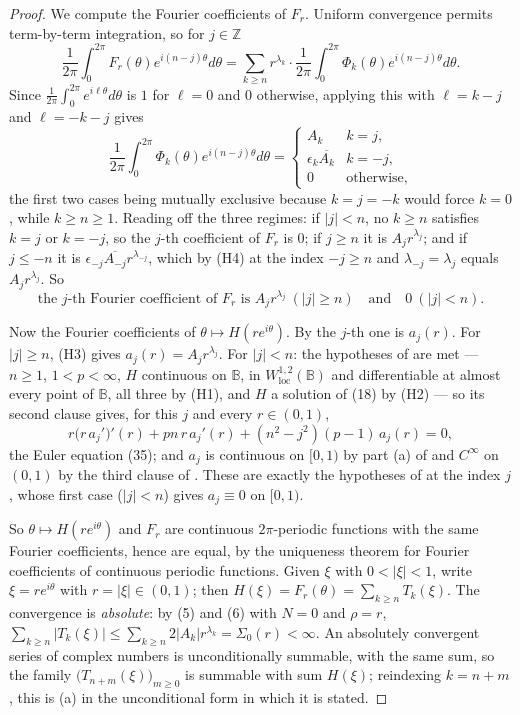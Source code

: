 \begin{proof}
We compute the Fourier coefficients of $F_r$.  Uniform convergence permits
term-by-term integration, so for $j\in\mathbb{Z}$
\[
  \frac1{2\pi}\int_0^{2\pi}F_r(\theta)e^{i(n-j)\theta}d\theta
  =\sum_{k\ge n}r^{\lambda_k}\cdot\frac1{2\pi}
    \int_0^{2\pi}\Phi_k(\theta)e^{i(n-j)\theta}d\theta .
\]
Since $\frac1{2\pi}\int_0^{2\pi}e^{i\ell\theta}d\theta$ is $1$ for $\ell=0$ and
$0$ otherwise, applying this with $\ell=k-j$ and $\ell=-k-j$ gives
\[
  \frac1{2\pi}\int_0^{2\pi}\Phi_k(\theta)e^{i(n-j)\theta}d\theta
  =\begin{cases}
     A_k&k=j,\\
     \epsilon_k\overline{A_k}&k=-j,\\
     0&\text{otherwise},
   \end{cases}
\]
the first two cases being mutually exclusive because $k=j=-k$ would force
$k=0$, while $k\ge n\ge1$.  Reading off the three regimes: if $|j|<n$, no
$k\ge n$ satisfies $k=j$ or $k=-j$, so the $j$-th coefficient of $F_r$ is $0$;
if $j\ge n$ it is $A_jr^{\lambda_j}$; and if $j\le-n$ it is
$\epsilon_{-j}\overline{A_{-j}}r^{\lambda_{-j}}$, which by (H4) at the index
$-j\ge n$ and $\lambda_{-j}=\lambda_j$ equals $A_jr^{\lambda_j}$.  So
\begin{equation}\tag{12}
  \text{the }j\text{-th Fourier coefficient of }F_r\text{ is }
  A_jr^{\lambda_j}\ (|j|\ge n)\quad\text{and}\quad0\ (|j|<n).
\end{equation}

Now the Fourier coefficients of $\theta\mapsto H(re^{i\theta})$.  By
 the $j$-th one is $a_j(r)$.  For $|j|\ge n$, (H3)
gives $a_j(r)=A_jr^{\lambda_j}$.  For $|j|<n$: the hypotheses of
 are met --- $n\ge1$, $1<p<\infty$, $H$ continuous on
$\mathbb{B}$, in $W^{1,2}_{\mathrm{loc}}(\mathbb{B})$ and differentiable at
almost every point of $\mathbb{B}$, all three by (H1), and $H$ a solution of
(18) by (H2) --- so its second clause gives, for this $j$ and every
$r\in(0,1)$,
\[
  r\bigl(r\,a_j'\bigr)'(r)+pn\,r\,a_j'(r)+(n^2-j^2)(p-1)\,a_j(r)=0,
\]
the Euler equation (35); and $a_j$ is continuous on $[0,1)$ by part (a) of
 and $C^\infty$ on $(0,1)$ by the third clause
of .  These are exactly the hypotheses of
 at the index $j$, whose first case ($|j|<n$) gives
$a_j\equiv0$ on $[0,1)$.

So $\theta\mapsto H(re^{i\theta})$ and $F_r$ are continuous $2\pi$-periodic
functions with the same Fourier coefficients, hence are equal, by the
uniqueness theorem for Fourier coefficients of continuous periodic functions.
Given $\xi$ with $0<|\xi|<1$, write $\xi=re^{i\theta}$ with $r=|\xi|\in(0,1)$;
then $H(\xi)=F_r(\theta)=\sum_{k\ge n}T_k(\xi)$.  The convergence is
\emph{absolute}: by (5) and (6) with $N=0$ and $\rho=r$,
$\sum_{k\ge n}|T_k(\xi)|\le\sum_{k\ge n}2|A_k|r^{\lambda_k}=\Sigma_0(r)<\infty$.
An absolutely convergent series of complex numbers is unconditionally
summable, with the same sum, so the family $\bigl(T_{n+m}(\xi)\bigr)_{m\ge0}$
is summable with sum $H(\xi)$; reindexing $k=n+m$, this is (a) in the
unconditional form in which it is stated.


\end{proof}

